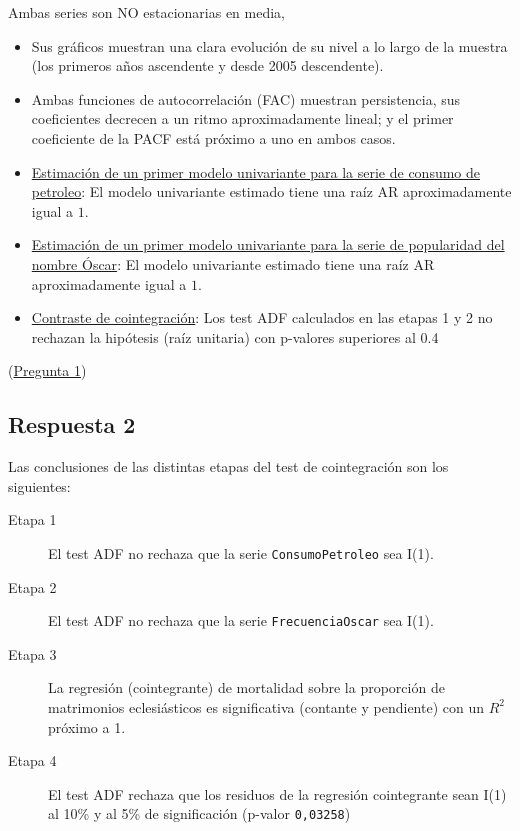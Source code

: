 \documentclass[10pt]{article}
\begin{document}
Ambas series son NO estacionarias en media,
\begin{itemize}
\item Sus gráficos muestran una clara evolución de su nivel a lo largo de
la muestra (los primeros años ascendente y desde 2005 descendente).

\item Ambas funciones de autocorrelación (FAC) muestran persistencia, sus
coeficientes decrecen a un ritmo aproximadamente lineal; y el primer
coeficiente de la PACF está próximo a uno en ambos casos.

\item \hyperref[sec:org93a870f]{Estimación de un primer modelo univariante para la serie de consumo de petroleo}: El modelo univariante estimado tiene una raíz AR
aproximadamente igual a \(1\).

\item \hyperref[sec:org7c22c5c]{Estimación de un primer modelo univariante para la serie de popularidad del nombre Óscar}: El modelo univariante estimado tiene
una raíz AR aproximadamente igual a \(1\).

\item \hyperref[sec:org21dd2ed]{Contraste de cointegración}: Los test ADF calculados en las etapas 1
y 2 no rechazan la hipótesis (raíz unitaria) con p-valores
superiores al 0.4
\end{itemize}

(\hyperref[sec:org54f35a6]{Pregunta 1})
\subsection*{Respuesta 2}
\label{sec:orgecbbcab}

Las conclusiones de las distintas etapas del test de cointegración son los siguientes:
\begin{description}
\item[{Etapa 1}] El test ADF no rechaza que la serie  \texttt{ConsumoPetroleo} sea I(1).
\item[{Etapa 2}] El test ADF no rechaza que la serie  \texttt{FrecuenciaOscar} sea I(1).
\item[{Etapa 3}] La regresión (cointegrante) de mortalidad sobre la
proporción de matrimonios eclesiásticos es significativa (contante y
pendiente) con un \(R^2\) próximo a 1.
\item[{Etapa 4}] El test ADF rechaza que los residuos de la regresión
cointegrante sean I(1) al 10\% y al 5\% de significación (p-valor
\texttt{0,03258})
\end{description}
\end{document}
